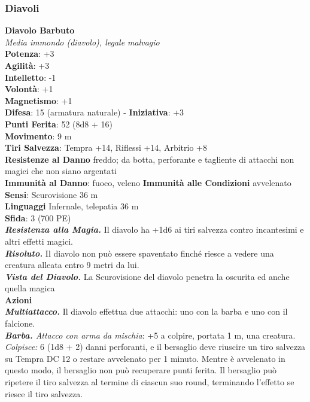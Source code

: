 \begin{multicols}{2}
\subsubsection{Diavoli}

\medskip\textbf{Diavolo Barbuto}\\
\emph{Media immondo (diavolo), legale malvagio}\\
\textbf{Potenza}: +3\\
\textbf{Agilità}: +3\\
\textbf{Intelletto}: -1\\
\textbf{Volontà}: +1\\
\textbf{Magnetismo}: +1\\
\textbf{Difesa}: 15 (armatura naturale) - \textbf{Iniziativa}: +3\\
\textbf{Punti Ferita}: 52 (8d8 + 16)\\
\textbf{Movimento}: 9 m\\
\textbf{Tiri Salvezza}: Tempra +14, Riflessi +14, Arbitrio +8\\
\textbf{Resistenze al Danno} freddo; da botta, perforante e tagliente di attacchi non magici che non siano argentati\\
\textbf{Immunità al Danno}: fuoco, veleno \textbf{Immunità alle Condizioni} avvelenato\\
\textbf{Sensi}: Scurovisione 36 m\\
\textbf{Linguaggi} Infernale, telepatia 36 m \\
\textbf{Sfida}: 3 (700 PE)\smallskip\\
\emph{\textbf{Resistenza alla Magia.}} Il diavolo ha +1d6 ai tiri salvezza contro incantesimi e altri effetti magici.\\
\emph{\textbf{Risoluto.}} Il diavolo non può essere spaventato finché riesce a vedere una creatura alleata entro 9 metri da lui.\\
\emph{\textbf{Vista del Diavolo.}} La Scurovisione del diavolo penetra la oscurita ed anche quella magica\\
\smallskip\textbf{Azioni}\\
\emph{\textbf{Multiattacco.}} Il diavolo effettua due attacchi: uno con la barba e uno con il falcione.\\
\emph{\textbf{Barba.} Attacco con arma da mischia}: +5 a colpire, portata 1 m, una creatura.\\
\emph{Colpisce:} 6 (1d8 + 2) danni perforanti, e il bersaglio deve riuscire un tiro salvezza su Tempra DC 12 o restare avvelenato per 1 minuto. Mentre è avvelenato in questo modo, il bersaglio non può recuperare punti ferita. Il bersaglio può ripetere il tiro salvezza al termine di ciascun suo round, terminando l'effetto se riesce il tiro salvezza.\\

\end{multicols}
